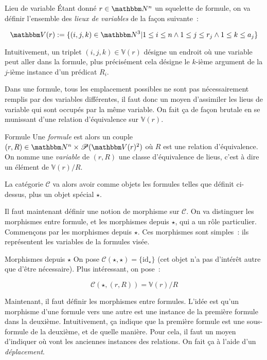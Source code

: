 \documentclass[12pt]{article}
\newcommand\V{\mathbb{V}}
\renewcommand\P{\mathscr{P}}
\renewcommand\C{\mathscr{C}}
\begin{document}
\begin{defi}{Lieu de variable}
    Étant donné $r\in\N^n$ un squelette de formule, on va définir l'ensemble des
    \emph{lieux de variables} de la façon suivante~:

    \[ \V(r):= \{(i,j,k)\in\N^3 |        1\leq i\leq n
                                  \wedge 1\leq j\leq r_j
                                  \wedge 1\leq k\leq a_j\} \]

    Intuitivement, un triplet $(i,j,k)\in\V(r)$ désigne un endroit où une variable peut
    aller dans la formule, plus précisément cela désigne le $k$-ième argument de la
    $j$-ième instance d'un prédicat $R_i$.
\end{defi}

Dans une formule, tous les emplacement possibles ne sont pas nécessairement remplis
par des variables différentes, il faut donc un moyen d'assimiler les lieus de variable
qui sont occupés par la même variable. On fait ça de façon brutale en se munissant d'une
relation d'équivalence sur $\V(r)$.

\begin{defi}{Formule}
    Une \emph{formule} est alors un couple $(r,R)\in\N^n\times\P(\V(r)^2)$ où $R$ est
    une relation d'équivalence. On nomme une \emph{variable} de $(r,R)$ une classe
    d'équivalence de lieus, c'est à dire un élément de $\V(r)/R$.
\end{defi}

La catégorie $\C$ va alors avoir comme objets les formules telles que définit ci-dessus,
plus un objet spécial $\star$.

Il faut maintenant définir une notion de morphisme sur $\C$. On va distinguer les
morphismes entre formule, et les morphismes depuis $\star$, qui a un rôle particulier.
Commençons par les morphismes depuis $\star$. Ces morphismes sont simples~: ils 
représentent les variables de la formules visée.

\begin{defi}{Morphismes depuis $\star$}
    On pose $\C(\star,\star) = \{\text{id}_\star\}$ (cet objet n'a pas d'intérêt autre
    que d'être nécessaire). Plus intéressant, on pose~:

    \[\C(\star, (r,R)) = \V(r)/R \]
\end{defi}

Maintenant, il faut définir les morphismes entre formules. L'idée est qu'un morphisme
d'une formule vers une autre est une instance de la première formule dans la deuxième.
Intuitivement, ça indique que la première formule est une sous-formule de la deuxième,
et de quelle manière. Pour cela, il faut un moyen d'indiquer où vont les anciennes
instances des relations. On fait ça à l'aide d'un \emph{déplacement}.
\end{document}

